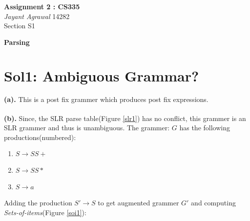 \documentclass{article}
\begin{document}

\begin{center}
\textbf{\huge Assignment 2 : CS335} \\
\textit{\Large Jayant Agrawal}         14282 \\
Section S1
\end{center}

\textbf{\huge Parsing}
\section*{Sol1: Ambiguous Grammar?}
\textbf{(a).} This is a post fix grammer which produces post fix expressions. \\ \\
\textbf{(b).} Since, the SLR parse table(Figure \ref{slr1}) has no conflict, this grammer is an SLR grammer and thus is unambiguous.
The grammer: $G$ has the following productions(numbered):
\begin{enumerate}
\item $S \rightarrow S S +$
\item $S \rightarrow S S *$
\item $S \rightarrow a$
\end{enumerate}
Adding the production $S' \rightarrow S$ to get augmented grammer $G'$ and computing \emph{Sets-of-items}(Figure \ref{soi1}):
\end{document}
